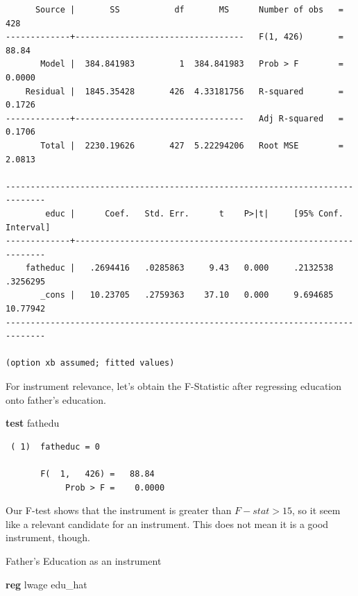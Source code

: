 \documentclass[
]{book}
\newenvironment{Shaded}{\begin{snugshade}}{\end{snugshade}}
\newcommand{\KeywordTok}[1]{\textcolor[rgb]{0.13,0.29,0.53}{\textbf{#1}}}
\newcommand{\NormalTok}[1]{#1}
\begin{document}
\begin{verbatim}
      Source |       SS           df       MS      Number of obs   =       428
-------------+----------------------------------   F(1, 426)       =     88.84
       Model |  384.841983         1  384.841983   Prob > F        =    0.0000
    Residual |  1845.35428       426  4.33181756   R-squared       =    0.1726
-------------+----------------------------------   Adj R-squared   =    0.1706
       Total |  2230.19626       427  5.22294206   Root MSE        =    2.0813

------------------------------------------------------------------------------
        educ |      Coef.   Std. Err.      t    P>|t|     [95% Conf. Interval]
-------------+----------------------------------------------------------------
    fatheduc |   .2694416   .0285863     9.43   0.000     .2132538    .3256295
       _cons |   10.23705   .2759363    37.10   0.000     9.694685    10.77942
------------------------------------------------------------------------------

(option xb assumed; fitted values)
\end{verbatim}

For instrument relevance, let's obtain the F-Statistic after regressing education onto father's education.

\begin{Shaded}
\begin{Highlighting}[]
\KeywordTok{test}\NormalTok{ fathedu}
\end{Highlighting}
\end{Shaded}

\begin{verbatim}
 ( 1)  fatheduc = 0

       F(  1,   426) =   88.84
            Prob > F =    0.0000
\end{verbatim}

Our F-test shows that the instrument is greater than \(F-stat > 15\), so it seem like a relevant candidate for an instrument. This does not mean it is a good instrument, though.

Father's Education as an instrument

\begin{Shaded}
\begin{Highlighting}[]
\KeywordTok{reg}\NormalTok{ lwage edu\_hat}
\end{Highlighting}
\end{Shaded}
\end{document}
